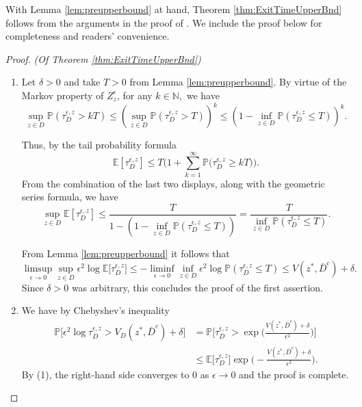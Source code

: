 \documentclass[10pt, reqno]{amsart}
\newcommand{\pr}{\mathbb{P}}
\newcommand{\ex}{\mathbb{E}}
\theoremstyle{definition}
\numberwithin{lem}{section}
\numberwithin{cor}{section}
\numberwithin{prop}{section}
\numberwithin{thm}{section}
\numberwithin{dfn}{section}
\begin{document}
\noindent With Lemma \ref{lem:preupperbound} at hand, Theorem \ref{thm:ExitTimeUpperBnd} follows from the arguments in the proof of \cite[Theorem 5.7.11(a)]{dembo2009large}. We include the proof below for completeness and readers' convenience.


\begin{proof}{\textit{(Of Theorem \ref{thm:ExitTimeUpperBnd})}}



\begin{enumerate}
    \item Let $\delta>0$ and take $T>0$ from Lemma \ref{lem:preupperbound}.
By virtue of the Markov property of $Z^\epsilon_z$, for any $k \in \mathbb{N},$ we have
\begin{equation*}
  \sup_{z \in D} \pr(\tau^{\epsilon,z}_D > kT) \leq \left(\sup_{z \in D} \pr(\tau^{\epsilon,z}_D > T) \right)^k \leq \left( 
 1 - \inf_{z \in D} \pr(\tau^{\epsilon,z}_D \leq T)\right)^k.
\end{equation*}

Thus, by the tail probability formula
$$\ex[ \tau_D^{\epsilon,z}]\leq T\bigg(      1+   \sum_{k=1}^{\infty}\pr\big( \tau_D^{\epsilon,z}\geq kT  \big)\bigg).    $$
From the combination of the last two displays, along with the geometric series formula, we have 
$$ \sup_{z \in D}\ex[ \tau_D^{\epsilon,z}]\leq\frac{T}{1-\left(1 - \inf_{z \in D} \pr(\tau^{\epsilon,z}_D \leq T) \right)} = \frac{T}{ \inf_{z \in D} \pr(\tau^{\epsilon,z}_D \leq T)}.$$

From Lemma \ref{lem:preupperbound} it follows that 
$$   \limsup_{\epsilon\to 0} \sup_{z \in D}\epsilon^2\log\ex\big[ \tau_D^{\epsilon,z}\big]\leq    -\liminf_{\epsilon \to 0} \inf_{z \in D} \epsilon^2\log\pr( \tau_D^{\epsilon,z}\leq T)\leq  V(z^*, \bar{D}^c)+\delta.  $$
Since $\delta>0$ was arbitrary, this concludes the proof of the first assertion. 
\item We have by Chebyshev's inequality
\begin{equation*}
    \begin{aligned}
        \pr\bigg[ \epsilon^2\log\tau_D^{\epsilon,z}>V_D(z^*, \bar{D}^c)+\delta \bigg]&=  \pr\bigg[ \tau_D^{\epsilon,z}>\exp\bigg(\frac{V(z^*, \bar{D}^c)+\delta}{\epsilon^2}\bigg)                              \bigg]\\&\leq \ex\big[ \tau_D^{\epsilon,z}\big]\exp\bigg(-\frac{V(z^*, \bar{D}^c)+\delta}{\epsilon^2}\bigg).  
    \end{aligned}
\end{equation*}  
By (1), the right-hand side converges to $0$ as $\epsilon\to 0$ and the proof is complete.\end{enumerate}\end{proof}
\end{document}
